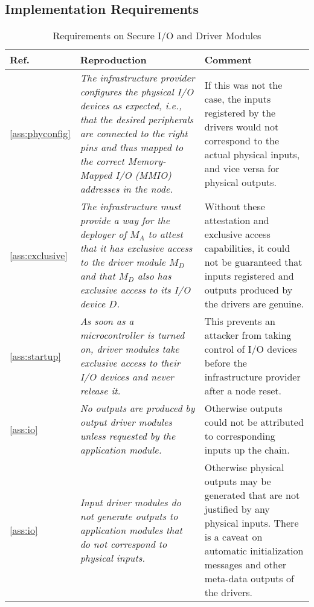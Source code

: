 \pagebreak
\subsection{Implementation Requirements}
\label{app:req}

\setcounter{table}{0}
\renewcommand{\thetable}{\protect\NoHyper\ref{app:req}.\arabic{table}\protect\endNoHyper}

\begin{longtable}{|p{}|p{}|p{}|}
\caption{Requirements on Secure I/O and Driver Modules}\\
\hline
Ref. & Reproduction & Comment \\
\hline
\hline

\ref{ass:phyconfig} &
\em The infrastructure provider configures the physical I/O devices as expected, i.e., that the desired peripherals are connected to the right pins and thus mapped to the correct Memory-Mapped I/O (MMIO) addresses in the node. &
If this was not the case, the inputs registered by the drivers would not correspond to the actual physical inputs, and vice versa for physical outputs.\\
\hline

\ref{ass:exclusive} & 
\em The infrastructure must provide a way for the deployer of $M_A$ to attest that it has exclusive access to the driver module $M_D$ and that $M_D$ also has exclusive access to its I/O device $D$. & 
Without these attestation and exclusive access capabilities, it could not be guaranteed that inputs registered and outputs produced by the drivers are genuine. \\
\hline

\ref{ass:startup} & 
\em As soon as a microcontroller is turned on, driver modules take exclusive access to their I/O devices and never release it. &
This prevents an attacker from taking control of I/O devices before the infrastructure provider after a node reset. \\
\hline

\ref{ass:io} &
\em No outputs are produced by output driver modules unless requested by the application module. &
Otherwise outputs could not be attributed to corresponding inputs up the chain. \\
\hline

\ref{ass:io} &
\em Input driver modules do not generate outputs to application modules that do not correspond to physical inputs. & 
Otherwise physical outputs may be generated that are not justified by any physical inputs. There is a caveat on automatic initialization messages and other meta-data outputs of the drivers.\\
\hline

\end{longtable}

